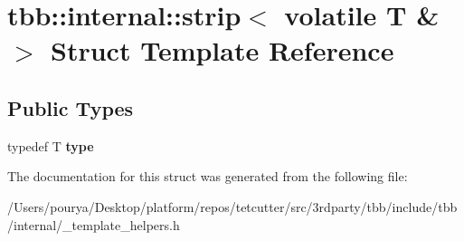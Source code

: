 \hypertarget{structtbb_1_1internal_1_1strip_3_01volatile_01T_01_6_01_4}{}\section{tbb\+:\+:internal\+:\+:strip$<$ volatile T \& $>$ Struct Template Reference}
\label{structtbb_1_1internal_1_1strip_3_01volatile_01T_01_6_01_4}
\subsection*{Public Types}
\begin{DoxyCompactItemize}
\item 
\hypertarget{structtbb_1_1internal_1_1strip_3_01volatile_01T_01_6_01_4_a8cdc107de046c9547e590314578ee2e2}{}typedef T {\bfseries type}\label{structtbb_1_1internal_1_1strip_3_01volatile_01T_01_6_01_4_a8cdc107de046c9547e590314578ee2e2}

\end{DoxyCompactItemize}


The documentation for this struct was generated from the following file\+:\begin{DoxyCompactItemize}
\item 
/\+Users/pourya/\+Desktop/platform/repos/tetcutter/src/3rdparty/tbb/include/tbb/internal/\+\_\+template\+\_\+helpers.\+h\end{DoxyCompactItemize}
